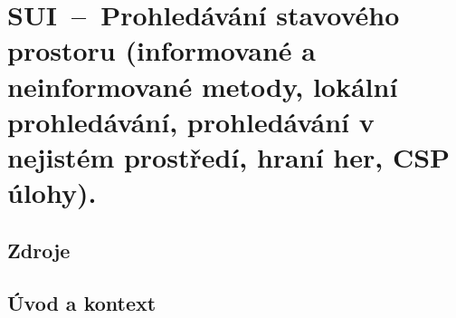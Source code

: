 

\graphicspath{{sui/prohledavani_stavoveho_prostoru/figures}}


\chapter{SUI~--~Prohledávání stavového prostoru (informované a neinformované metody, lokální prohledávání, prohledávání v nejistém prostředí, hraní her, CSP úlohy).}


\section{Zdroje}

\begin{compactitem}
    \item {}
    \item {}
    \item {}
    \item {}
    \item {}
    \item {}
    \item {}
\end{compactitem}


\section{Úvod a kontext}

